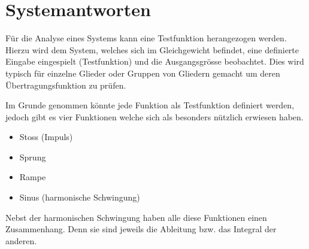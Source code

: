 \section{Systemantworten}
Für die Analyse eines Systems kann eine Testfunktion herangezogen
werden. Hierzu wird dem System, welches sich im Gleichgewicht
befindet, eine definierte Eingabe eingespielt (Testfunktion) und
die Ausgangsgrösse beobachtet. Dies wird typisch für einzelne
Glieder oder Gruppen von Gliedern gemacht um deren 
Übertragungsfunktion zu prüfen.

Im Grunde genommen könnte jede Funktion als Testfunktion definiert
werden, jedoch gibt es vier Funktionen welche sich als besonders
nützlich erwiesen haben.
%
\begin{itemize}
	\item Stoss (Impuls)
    \item Sprung
    \item Rampe
    \item Sinus (harmonische Schwingung)
\end{itemize}
%
Nebst der harmonischen Schwingung haben alle diese Funktionen
einen Zusammenhang. Denn sie sind jeweils die Ableitung bzw. das
Integral der anderen.

